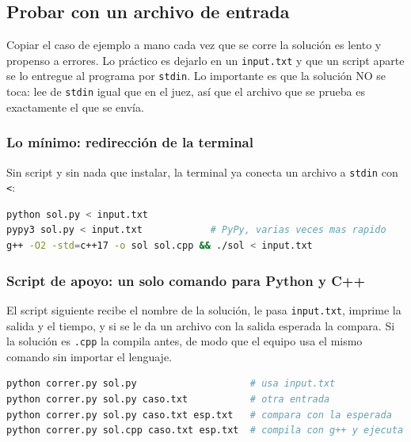 \subsection{Probar con un archivo de entrada}
\label{alg:2-0}

Copiar el caso de ejemplo a mano cada vez que se corre la solución es lento y
propenso a errores. Lo práctico es dejarlo en un \texttt{input.txt} y que un script
aparte se lo entregue al programa por \texttt{stdin}. Lo importante es que la
solución NO se toca: lee de \texttt{stdin} igual que en el juez, así que el archivo
que se prueba es exactamente el que se envía.

\subsubsection{Lo mínimo: redirección de la terminal}

Sin script y sin nada que instalar, la terminal ya conecta un archivo a
\texttt{stdin} con \texttt{<}:

\begin{lstlisting}[language=bash]
python sol.py < input.txt
pypy3 sol.py < input.txt            # PyPy, varias veces mas rapido
g++ -O2 -std=c++17 -o sol sol.cpp && ./sol < input.txt
\end{lstlisting}

\vspace{0.3cm}
\subsubsection{Script de apoyo: un solo comando para Python y C++}

El script siguiente recibe el nombre de la solución, le pasa \texttt{input.txt},
imprime la salida y el tiempo, y si se le da un archivo con la salida esperada la
compara. Si la solución es \texttt{.cpp} la compila antes, de modo que el equipo usa
el mismo comando sin importar el lenguaje.

\begin{lstlisting}[language=bash]
python correr.py sol.py                    # usa input.txt
python correr.py sol.py caso.txt           # otra entrada
python correr.py sol.py caso.txt esp.txt   # compara con la esperada
python correr.py sol.cpp caso.txt esp.txt  # compila con g++ y ejecuta
\end{lstlisting}

